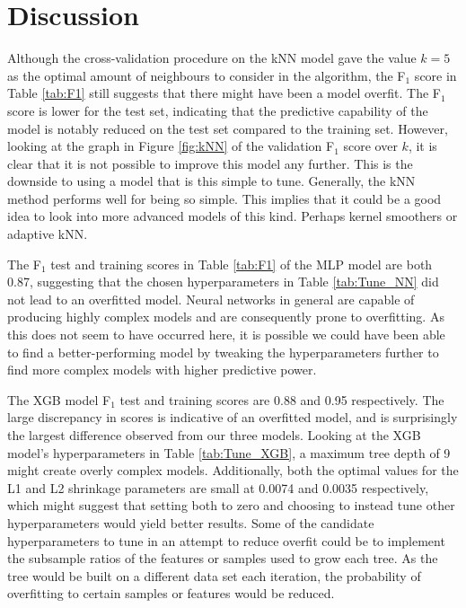 \documentclass[a4paper, 11pt, twocolumn]{article}
\begin{document}
\section{Discussion}
Although the cross-validation procedure on the kNN model gave the value $k=5$ as 
the optimal amount of neighbours to consider in the algorithm, the F$_1$ score 
in Table \ref{tab:F1} still suggests that there might have been a model overfit. 
The F$_1$ score is lower for the test set, indicating that the predictive 
capability of the model is notably reduced on the test set compared to the 
training set. However, looking at the graph in Figure \ref{fig:kNN} of the 
validation F$_1$ score over $k$, it is clear that it is not possible to improve 
this model any further. This is the downside to using a model that is this simple 
to tune. Generally, the kNN method performs well for being so simple. This implies 
that it could be a good idea to look into more advanced models of this kind. 
Perhaps kernel smoothers or adaptive kNN.

The F$_1$ test and training scores in Table \ref{tab:F1} of the MLP model are 
both 0.87, suggesting that the chosen hyperparameters in Table 
\ref{tab:Tune_NN} did not lead to an overfitted model. Neural networks in 
general are capable of producing highly complex models and are consequently 
prone to overfitting. As this does not seem to have occurred here, it is possible 
we could have been able to find a better-performing model by tweaking the 
hyperparameters further to find more complex models with higher predictive 
power. 

The XGB model F$_1$ test and training scores are 0.88 and 0.95 respectively. 
The large discrepancy in scores is indicative of an overfitted model, and is 
surprisingly the largest difference observed from our three models. Looking at 
the XGB model's hyperparameters in Table \ref{tab:Tune_XGB}, a maximum tree 
depth of 9 might create overly complex models. Additionally, both the optimal 
values for the L1 and L2 shrinkage parameters are small at 0.0074 and 0.0035 
respectively, which might suggest that setting both to zero and choosing to 
instead tune other hyperparameters would yield better results. Some of the 
candidate hyperparameters to tune in an attempt to reduce overfit could be to 
implement the subsample ratios of the features or samples used to grow each 
tree. As the tree would be built on a different data set each iteration, the 
probability of overfitting to certain samples or features would be reduced. 
\end{document}

